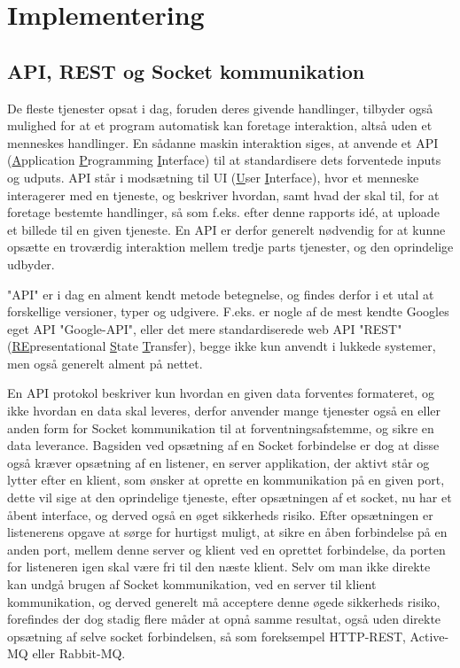\section{Implementering}
\subsection{API, REST og Socket kommunikation}
De fleste tjenester opsat i dag, foruden deres givende handlinger, tilbyder også mulighed for at et program automatisk kan foretage interaktion, altså uden et menneskes handlinger. En sådanne maskin interaktion siges, at anvende et API (\underline{A}pplication \underline{P}rogramming \underline{I}nterface) til at standardisere dets forventede inputs og udputs. 
API står i modsætning til UI (\underline{U}ser \underline{I}nterface), hvor et menneske interagerer med en tjeneste, og beskriver hvordan, samt hvad der skal til, for at foretage bestemte handlinger, så som f.eks. efter denne rapports idé, at uploade et billede til en given tjeneste. En API er derfor generelt nødvendig for at kunne opsætte en troværdig interaktion mellem tredje parts tjenester, og den oprindelige udbyder. \cite{WhatIsAPI}

"API" er i dag en alment kendt metode betegnelse, og findes derfor i et utal at forskellige versioner, typer og udgivere. F.eks. er nogle af de mest kendte Googles eget API "Google-API", eller det mere standardiserede web API "REST" (\underline{RE}presentational \underline{S}tate \underline{T}ransfer), begge ikke kun anvendt i lukkede systemer, men også generelt alment på nettet. \cite{codecademy_REST}

En API protokol beskriver kun hvordan en given data forventes formateret, og ikke hvordan en data skal leveres, derfor anvender mange tjenester også en eller anden form for Socket kommunikation til at forventningsafstemme, og sikre en data leverance. Bagsiden ved opsætning af en Socket forbindelse er dog at disse også kræver opsætning af en listener, en server applikation, der aktivt står og lytter efter en klient, som ønsker at oprette en kommunikation på en given port, dette vil sige at den oprindelige tjeneste, efter opsætningen af et socket, nu har et åbent interface, og derved også en øget sikkerheds risiko. Efter opsætningen er listenerens opgave at sørge for hurtigst muligt, at sikre en åben forbindelse på en anden port, mellem denne server og klient ved en oprettet forbindelse, da porten for listeneren igen skal være fri til den næste klient. \cite{WhatIsSocket} Selv om man ikke direkte kan undgå brugen af Socket kommunikation, ved en server til klient kommunikation, og derved generelt må acceptere denne øgede sikkerheds risiko, forefindes der dog stadig flere måder at opnå samme resultat, også uden direkte opsætning af selve socket forbindelsen, så som foreksempel HTTP-REST, Active-MQ eller Rabbit-MQ. \cite{SocketAlternatives}